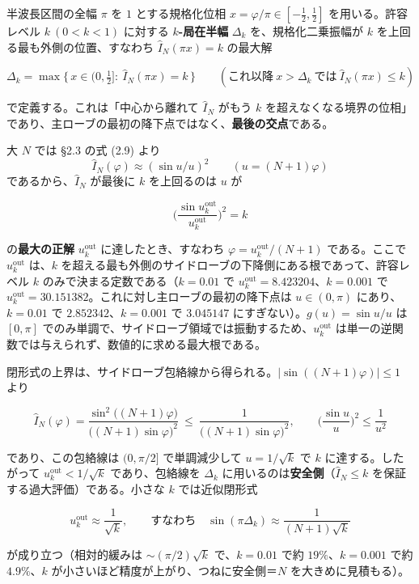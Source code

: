 \documentclass[
]{ltjsarticle}
\begin{document}
半波長区間の全幅 \(\pi\) を \(1\) とする規格化位相
\(x=\varphi/\pi\in[-\tfrac12,\tfrac12]\) を用いる。許容レベル
\(k\ (0<k<1)\) に対する \textbf{\(k\)-局在半幅} \(\Delta_k\)
を、規格化二乗振幅が \(k\) を上回る最も外側の位置、すなわち
\(\widehat{I}_N(\pi x)=k\) の最大解

\[
\Delta_k=\max\{\,x\in(0,\tfrac12]:\ \widehat{I}_N(\pi x)=k\,\}
\qquad(\text{これ以降}\ x>\Delta_k\ \text{では}\ \widehat{I}_N(\pi x)\le k)
\tag{2.10}
\]

で定義する。これは「中心から離れて \(\widehat{I}_N\) がもう \(k\)
を超えなくなる境界の位相」であり、主ローブの最初の降下点ではなく、\textbf{最後の交点}である。

大 \(N\) では §2.3 の式 (2.9) より
\[\widehat{I}_N(\varphi)\approx(\sin u/u)^2\qquad(u=(N+1)\varphi)\]
であるから、\(\widehat{I}_N\) が最後に \(k\) を上回るのは \(u\) が

\[
\Big(\frac{\sin u_k^{\mathrm{out}}}{u_k^{\mathrm{out}}}\Big)^2=k
\tag{2.11}
\]

の\textbf{最大の正解} \(u_k^{\mathrm{out}}\) に達したとき、すなわち
\(\varphi=u_k^{\mathrm{out}}/(N+1)\) である。ここで
\(u_k^{\mathrm{out}}\) は、\(k\)
を超える最も外側のサイドローブの下降側にある根であって、許容レベル \(k\)
のみで決まる定数である（\(k=0.01\) で
\(u_k^{\mathrm{out}}=8.423204\)、\(k=0.001\) で
\(u_k^{\mathrm{out}}=30.151382\)。これに対し主ローブの最初の降下点は
\(u\in(0,\pi)\) にあり、\(k=0.01\) で \(2.852342\)、\(k=0.001\) で
\(3.045147\) にすぎない）。\(g(u)=\sin u/u\) は \([0,\pi]\)
でのみ単調で、サイドローブ領域では振動するため、\(u_k^{\mathrm{out}}\)
は単一の逆関数では与えられず、数値的に求める最大根である。

閉形式の上界は、サイドローブ包絡線から得られる。\(|\sin((N+1)\varphi)|\le1\)
より

\[
\widehat{I}_N(\varphi)=\frac{\sin^2\!\big((N+1)\varphi\big)}{\big((N+1)\sin\varphi\big)^2}
\ \le\ \frac{1}{\big((N+1)\sin\varphi\big)^2},
\qquad
\Big(\frac{\sin u}{u}\Big)^2\le\frac{1}{u^2}
\tag{2.12}
\]

であり、この包絡線は \((0,\pi/2]\) で単調減少して \(u=1/\sqrt{k}\) で
\(k\) に達する。したがって \(u_k^{\mathrm{out}}<1/\sqrt{k}\)
であり、包絡線を \(\Delta_k\)
に用いるのは\textbf{安全側}（\(\widehat{I}_N\le k\)
を保証する過大評価）である。小さな \(k\) では近似閉形式

\[
u_k^{\mathrm{out}}\approx\frac{1}{\sqrt{k}},\qquad\text{すなわち}\quad
\sin(\pi\Delta_k)\approx\frac{1}{(N+1)\sqrt{k}}
\tag{2.13}
\]

が成り立つ（相対的緩みは \(\sim(\pi/2)\sqrt{k}\) で、\(k=0.01\) で約
\(19\%\)、\(k=0.001\) で約 \(4.9\%\)、\(k\)
が小さいほど精度が上がり、つねに安全側＝\(N\) を大きめに見積もる）。
\end{document}
